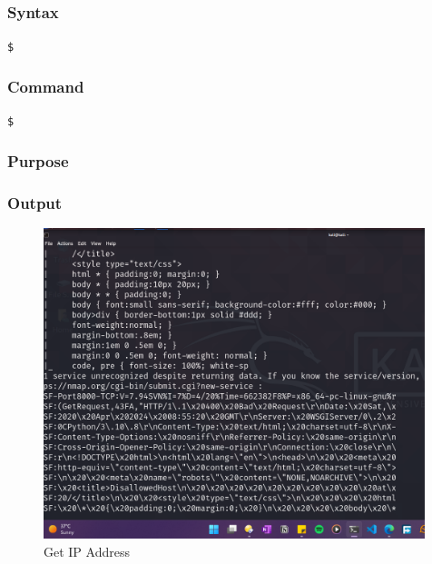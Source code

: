 \documentclass[11pt]{article}
\begin{document}
\subsection{}

\subsubsection*{Syntax}
\begin{verbatim}
$
\end{verbatim}

\subsubsection*{Command}
\begin{verbatim}
$
\end{verbatim}

\subsubsection*{Purpose}

\subsubsection*{Output}
\begin{figure}[H]
    \centering
    \includegraphics[width=0.99\textwidth]{a3_ss (9).png}
    \caption{Get IP Address}
    \label{fig:1}
\end{figure}
\subsection{}
\end{document}
